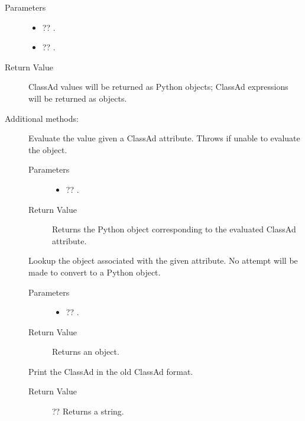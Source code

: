 \begin{description}
  \begin{description}
    \item[ Parameters]
    \begin{itemize}
      \item {} ?? . 
      \item {} ?? . 
    \end{itemize}
    \item[ Return Value]
      ClassAd values will be returned as Python objects; 
      ClassAd expressions will be returned as  objects.
  \end{description}  


\end{description}

Additional methods:
\begin{description}

\item []
  Evaluate the value given a ClassAd attribute.
  Throws  if unable to evaluate the object.

  \begin{description}
    \item[ Parameters]
    \begin{itemize}
      \item {} ?? . 
    \end{itemize}
    \item[ Return Value]
      Returns the Python object corresponding to the evaluated ClassAd
      attribute.
  \end{description}  

\item []
  Lookup the  object associated with the given attribute.
  No attempt will be made to convert to a Python object.

  \begin{description}
    \item[ Parameters]
    \begin{itemize}
      \item {} ?? . 
    \end{itemize}
    \item[ Return Value]
      Returns an  object.
  \end{description}  

\item []
  Print the ClassAd in the old ClassAd format.

  \begin{description}
    \item[ Return Value]
      ?? Returns a string.
  \end{description}  

\end{description}



 \MoreTodo
